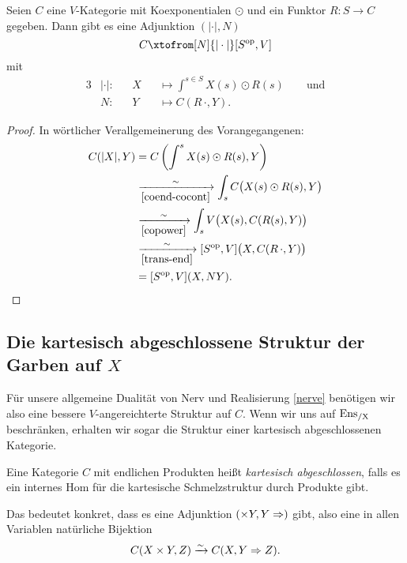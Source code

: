 \begin{theorem} 
  \label{nerve}
  Seien $C$ eine $V$-Kategorie mit Koexponentialen $\odot$ und ein
  Funktor $R: S \to C$ gegeben. Dann gibt es eine Adjunktion
  $(|\cdot|, N)$
  \[ C \xtofrom[N]{|\cdot|} [S\op, V] \]
  mit
  \begin{alignat*}{3}
    &|\cdot|: && X &&\mapsto \int^{s \in S} X(s) \odot R(s) \qquad \text{und} \\
    &N: && Y &&\mapsto C(R \, \cdot, Y).
  \end{alignat*}
\end{theorem}
\begin{proof}
  In wörtlicher Verallgemeinerung des Vorangegangenen:
  \begin{align*}
     C(|X|, Y)
     &= C \left( \int^s X(s) \odot R(s), Y \right) \\
     & \xrightarrow[\ref{coend-cocont}]{\sim}
       \int_s C \big( X(s) \odot R(s), Y \big) \\
     & \xrightarrow[\ref{copower}]{\sim}
       \int_s V \big( X(s), C(R(s), Y) \big) \\
     & \xrightarrow[\ref{trans-end}]{\sim}
       [S^\mathrm{op}, V] \big( X, C(R \, \cdot, Y) \big) \\
     &= [S^\mathrm{op}, V] (X, NY).
  \end{align*}
\end{proof}

\subsection{Die kartesisch abgeschlossene Struktur der Garben auf $X$}
\label{sec:ensx-cart-closed}

Für unsere allgemeine Dualität von Nerv und Realisierung \ref{nerve}
benötigen wir also eine bessere $V$-angereichterte Struktur auf
$C$. Wenn wir uns auf $\operatorname{Ens_{/X}}$ beschränken, erhalten wir sogar die
Struktur einer kartesisch abgeschlossenen Kategorie.
\begin{defn}
  Eine Kategorie $C$ mit endlichen Produkten heißt \emph{kartesisch
    abgeschlossen}, falls es ein internes Hom für die kartesische
  Schmelzstruktur durch Produkte gibt.
\end{defn}
Das bedeutet konkret, dass es eine Adjunktion $(\times Y, Y \Rightarrow)$
gibt, also eine in allen Variablen natürliche Bijektion
\[ C(X \times Y, Z) \xrightarrow[]{\sim} C(X, Y \Rightarrow Z). \]

